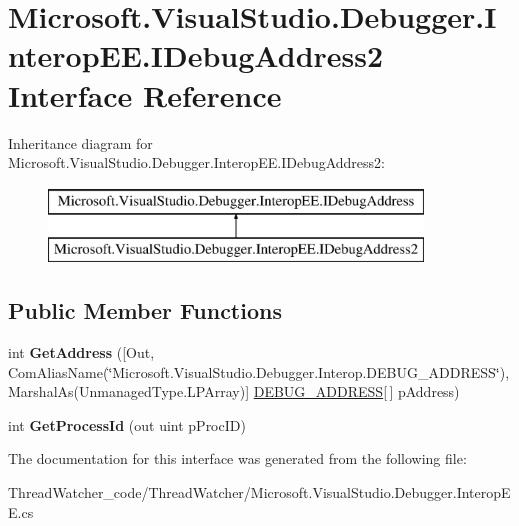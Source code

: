 \hypertarget{interface_microsoft_1_1_visual_studio_1_1_debugger_1_1_interop_e_e_1_1_i_debug_address2}{\section{Microsoft.\+Visual\+Studio.\+Debugger.\+Interop\+E\+E.\+I\+Debug\+Address2 Interface Reference}
\label{interface_microsoft_1_1_visual_studio_1_1_debugger_1_1_interop_e_e_1_1_i_debug_address2}
}
Inheritance diagram for Microsoft.\+Visual\+Studio.\+Debugger.\+Interop\+E\+E.\+I\+Debug\+Address2\+:\begin{figure}[H]
\begin{center}
\leavevmode
\includegraphics[height=2.000000cm]{interface_microsoft_1_1_visual_studio_1_1_debugger_1_1_interop_e_e_1_1_i_debug_address2}
\end{center}
\end{figure}
\subsection*{Public Member Functions}
\begin{DoxyCompactItemize}
\item 
\hypertarget{interface_microsoft_1_1_visual_studio_1_1_debugger_1_1_interop_e_e_1_1_i_debug_address2_a543b6578b5e338530863831b7bf91333}{int {\bfseries Get\+Address} (\mbox{[}Out, Com\+Alias\+Name(\char`\"{}Microsoft.\+Visual\+Studio.\+Debugger.\+Interop.\+D\+E\+B\+U\+G\+\_\+\+A\+D\+D\+R\+E\+S\+S\char`\"{}), Marshal\+As(Unmanaged\+Type.\+L\+P\+Array)\mbox{]} \hyperlink{struct_microsoft_1_1_visual_studio_1_1_debugger_1_1_interop_e_e_1_1_d_e_b_u_g___a_d_d_r_e_s_s}{D\+E\+B\+U\+G\+\_\+\+A\+D\+D\+R\+E\+S\+S}\mbox{[}$\,$\mbox{]} p\+Address)}\label{interface_microsoft_1_1_visual_studio_1_1_debugger_1_1_interop_e_e_1_1_i_debug_address2_a543b6578b5e338530863831b7bf91333}

\item 
\hypertarget{interface_microsoft_1_1_visual_studio_1_1_debugger_1_1_interop_e_e_1_1_i_debug_address2_a5b4eddf45069e04d14f417764580ebbc}{int {\bfseries Get\+Process\+Id} (out uint p\+Proc\+I\+D)}\label{interface_microsoft_1_1_visual_studio_1_1_debugger_1_1_interop_e_e_1_1_i_debug_address2_a5b4eddf45069e04d14f417764580ebbc}

\end{DoxyCompactItemize}


The documentation for this interface was generated from the following file\+:\begin{DoxyCompactItemize}
\item 
Thread\+Watcher\+\_\+code/\+Thread\+Watcher/Microsoft.\+Visual\+Studio.\+Debugger.\+Interop\+E\+E.\+cs\end{DoxyCompactItemize}
